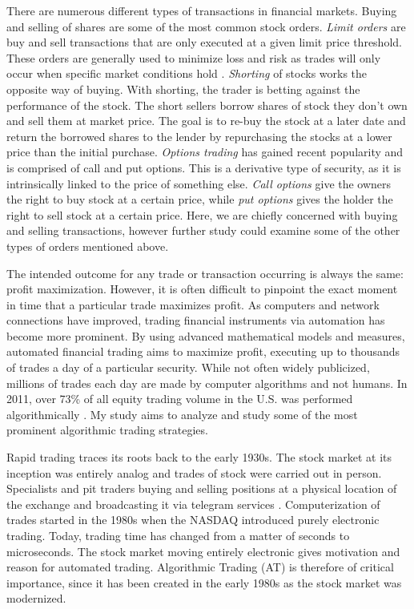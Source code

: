 \documentclass[letterpaper,11pt]{article}
\begin{document}
There are numerous different types of transactions in financial markets. Buying and selling of shares are some of the most common stock orders. {\it Limit orders} are buy and sell transactions that are only executed at a given limit price threshold. These orders are generally used to minimize loss and risk as trades will only occur when specific market conditions hold \cite{Aldridge2010}. {\it Shorting} of stocks works the opposite way of buying. With shorting, the trader is betting against the performance of the stock. The short sellers borrow shares of stock they don't own and sell them at market price. The goal is to re-buy the stock at a later date and return the borrowed shares to the lender by repurchasing the stocks at a lower price than the initial purchase. {\it Options trading} has gained recent popularity and is comprised of call and put options. This is a derivative type of security, as it is intrinsically linked to the price of something else. {\it Call options} give the owners the right to buy stock at a certain price, while {\it put options} gives the holder the right to sell stock at a certain price. Here, we are chiefly concerned with buying and selling transactions, however further study could examine some of the other types of orders mentioned above. 

 The intended outcome for any trade or transaction occurring is always the same: profit maximization. However, it is often difficult to pinpoint the exact moment in time that a particular trade maximizes profit. As computers and network connections have improved, trading financial instruments via automation has become more prominent. By using advanced mathematical models and measures, automated financial trading aims to maximize profit, executing up to thousands of trades a day of a particular security. While not often widely publicized, millions of trades each day are made by computer algorithms and not humans. In 2011, over 73\% of all equity trading volume in the U.S. was performed algorithmically \cite{Treleaven2013}. My study aims to analyze and study some of the most prominent algorithmic trading strategies.
 
 Rapid trading traces its roots back to the early 1930s. The stock market at its inception was entirely analog and trades of stock were carried out in person. Specialists and pit traders buying and selling positions at a physical location of the exchange and broadcasting it via telegram services \cite{Treleaven2013}.  Computerization of trades started in the 1980s when the NASDAQ introduced purely electronic trading. Today, trading time has changed from a matter of seconds to microseconds\cite{Treleaven2013}. The stock market moving entirely electronic gives motivation and reason for automated trading. Algorithmic Trading (AT) is therefore of critical importance, since it has been created in the early 1980s as the stock market was modernized. 
\end{document}
